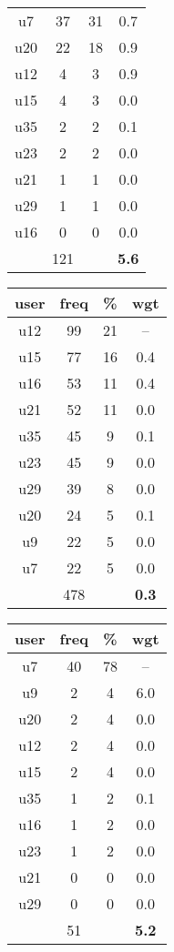 \begin{table}
\begin{tabular}{ |c|c|c|c| }
	u7 & 37 & 31 & 0.7 \\
	u20 & 22 & 18 & 0.9 \\
	u12 & 4 & 3 & 0.9 \\
	u15 & 4 & 3 & 0.0 \\
	u35 & 2 & 2 & 0.1 \\
	u23 & 2 & 2 & 0.0 \\
	u21 & 1 & 1 & 0.0 \\
	u29 & 1 & 1 & 0.0 \\
	u16 & 0 & 0 & 0.0 \\
	 & 121 & & \textbf{5.6} \\
	\hline
\end{tabular}
\begin{tabular}{ |c|c|c|c| }
	\hline
	\textbf{user} & \textbf{freq} & \textbf{\%} & \textbf{wgt} \\
	\hline
	u12 & 99 & 21 & -- \\
	u15 & 77 & 16 & 0.4 \\
	u16 & 53 & 11 & 0.4 \\
	u21 & 52 & 11 & 0.0 \\
	u35 & 45 & 9 & 0.1 \\
	u23 & 45 & 9 & 0.0 \\
	u29 & 39 & 8 & 0.0 \\
	u20 & 24 & 5 & 0.1 \\
	u9 & 22 & 5 & 0.0 \\
	u7 & 22 & 5 & 0.0 \\
	 & 478 & & \textbf{0.3} \\
	\hline
\end{tabular}
\begin{tabular}{ |c|c|c|c| }
	\hline
	\textbf{user} & \textbf{freq} & \textbf{\%} & \textbf{wgt} \\
	\hline
	u7 & 40 & 78 & -- \\
	u9 & 2 & 4 & 6.0 \\
	u20 & 2 & 4 & 0.0 \\
	u12 & 2 & 4 & 0.0 \\
	u15 & 2 & 4 & 0.0 \\
	u35 & 1 & 2 & 0.1 \\
	u16 & 1 & 2 & 0.0 \\
	u23 & 1 & 2 & 0.0 \\
	u21 & 0 & 0 & 0.0 \\
	u29 & 0 & 0 & 0.0 \\
	 & 51 & & \textbf{5.2} \\
	\hline

\end{tabular}
\end{table}
